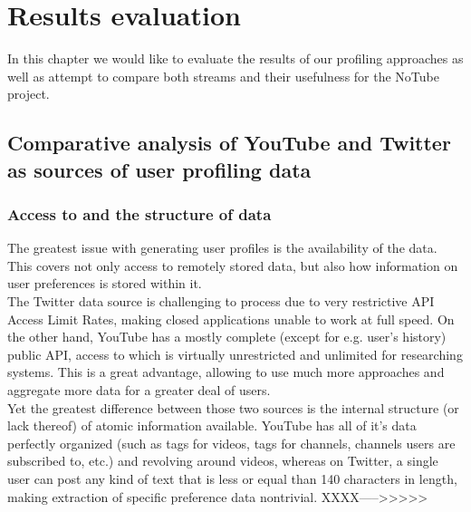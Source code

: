 \section{Results evaluation}

In this chapter we would like to evaluate the results of our profiling approaches as well as attempt to compare both streams and their usefulness for the NoTube project.

\subsection{Comparative analysis of YouTube and Twitter as sources of user
profiling data}

\subsubsection{Access to and the structure of data}
The greatest issue with generating user profiles is the availability of the data. This covers not only access to remotely
stored data, but also how information on user preferences is stored within it.
\\ The Twitter data source is challenging to process due to very restrictive API Access Limit Rates, making closed applications
unable to work at full speed. On the other hand, YouTube has a mostly complete (except for e.g. user's history) public API,
access to which is virtually unrestricted and unlimited for researching systems. This is a great advantage, allowing to use
much more approaches and aggregate more data for a greater deal of users.
\\ Yet the greatest difference between those two sources is the internal structure (or lack thereof) of atomic information
available. YouTube has all of it's data perfectly organized (such as tags for videos, tags for channels, channels users are
subscribed to, etc.) and revolving around videos, whereas on Twitter, a single user can post any kind of text that is
less or equal than 140 characters in length, making extraction of specific preference data nontrivial. XXXX----->>>>>

